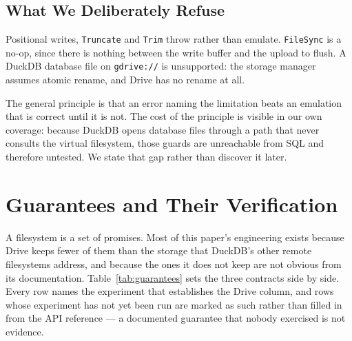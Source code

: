 \documentclass[sigconf, nonacm]{acmart}
\begin{document}
\subsection{What We Deliberately Refuse}
\label{sec:refuse}

Positional writes, \texttt{Truncate} and \texttt{Trim} throw rather than
emulate. \texttt{FileSync} is a no-op, since there is nothing between the
write buffer and the upload to flush. A DuckDB database file on
\texttt{gdrive://} is unsupported: the storage manager assumes atomic rename,
and Drive has no rename at all.

The general principle is that an error naming the limitation beats an
emulation that is correct until it is not. The cost of the principle is
visible in our own coverage: because DuckDB opens database files through a
path that never consults the virtual filesystem, those guards are unreachable
from SQL and therefore untested. We state that gap rather than discover it
later.

\section{Guarantees and Their Verification}
\label{sec:guarantees}

A filesystem is a set of promises. Most of this paper's engineering exists
because Drive keeps fewer of them than the storage that DuckDB's other remote
filesystems address, and because the ones it does not keep are not obvious
from its documentation. Table~\ref{tab:guarantees} sets the three contracts
side by side. Every row names the experiment that establishes the Drive
column, and rows whose experiment has not yet been run are marked as such
rather than filled in from the API reference --- a documented guarantee that
nobody exercised is not evidence.
\end{document}
